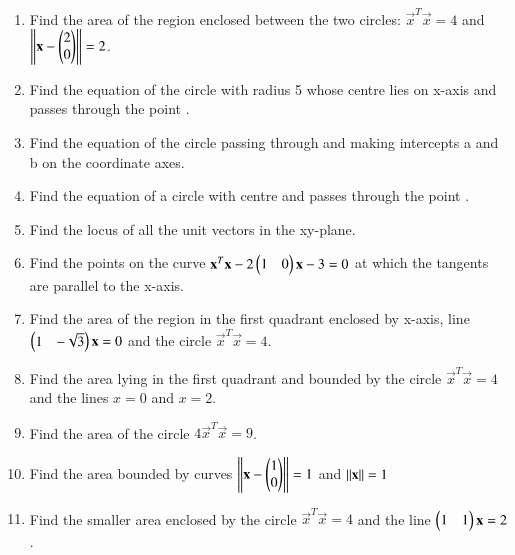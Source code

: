\renewcommand{\theequation}{\theenumi}
\begin{enumerate}[label=\thesection.\arabic*.,ref=\thesection.\theenumi]

\item Find the area of the region enclosed between the two circles: $\vec{x}^T\vec{x} = 4$ and $\left\lVert\mathbf{x}-\begin{pmatrix}2\\0\end{pmatrix}\right\rVert = 2$.
\\
\solution 

\item Find the equation of the circle with radius 5 whose centre lies on x-axis and passes through the point .
\\
\solution 

\item Find the equation of the circle passing through  and making intercepts a and b on the coordinate axes.
\item Find the equation of a circle with centre  and passes through the point . 
\\
\solution 

\item Find the locus of all the unit vectors in the xy-plane.
%
\item Find the points on the curve $\mathbf{x}^T\mathbf{x}-2\begin{pmatrix}1 & 0\end{pmatrix}\mathbf{x} -3 =0$  at which the tangents are parallel to the x-axis.
%
\item  Find the area of the region in the first quadrant enclosed by x-axis, line $\begin{pmatrix}1 & -\sqrt{3}\end{pmatrix}\mathbf{x} =0$ and the circle $\vec{x}^T\vec{x}=4$.
%
\\
\solution

\item Find the area lying in the first quadrant and bounded by the circle $\vec{x}^T\vec{x}=4$ and the lines $x = 0$ and $x = 2$.
%
\item Find the area of the circle $4\vec{x}^T\vec{x}=9$.
\item  Find the area bounded by curves $\left\lVert\mathbf{x}-\begin{pmatrix}1\\0\end{pmatrix}\right\rVert = 1$ and $\left\lVert\mathbf{x}\right\rVert=1$
\item Find the smaller area enclosed by the circle $\vec{x}^T\vec{x}=4$ and the line $\begin{pmatrix}1 & 1\end{pmatrix}\mathbf{x} = 2$.



\end{enumerate}
